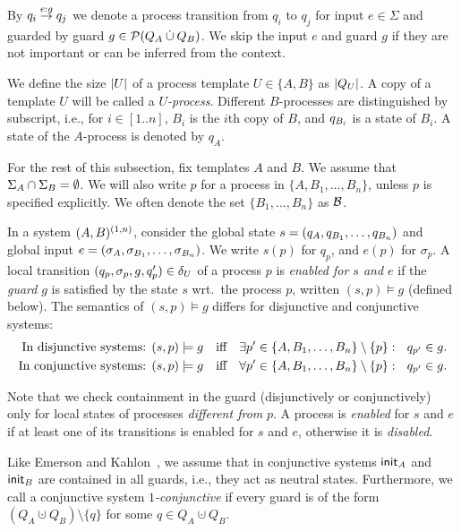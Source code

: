 By $\transition{q_i}{q_j}{e:g}$
we denote a process transition from $q_i$ to $q_j$
for input $e \in \Sigma$ and guarded by guard $g \in \mP(Q_A \cupdot Q_B)$.
We skip the input $e$ and guard $g$
if they are not important or can be inferred from the context.

We define the size $\card{U}$ of a process template $U \in \{A,B\}$ as $\card{\stateset_U}$. A copy of a template $U$ will be called a \emph{$U$-process}.
Different $B$-processes are distinguished by subscript, i.e., for $i \in [1..n]$, $B_i$ is the $i$th copy of $B$, and $\state_{B_i}$ is a state of $B_i$. A state of the $A$-process is denoted by $q_A$. 

For the rest of this subsection, fix templates $A$ and $B$. We assume that $\inputs_A \cap \inputs_B = \emptyset$. We will also write $p$ for a process in $\{ A, B_1, \ldots, B_n\}$, unless $p$ is specified explicitly.
We often denote the set $\{B_1,...,B_n\}$ as $\mB$.


In a system $\largesys$,
consider the global state $s = (\state_A,\state_{B_1},\ldots,\state_{B_n})$ and
global input $e=(\localin_A,\localin_{B_1},\ldots,\localin_{B_n})$.
We write $s(p)$ for $q_p$, and $e(p)$ for $\sigma_p$.
A local transition $(\state_p,\localin_p,g,\state_p') \in \delta_U$ of a process $p$ is \emph{enabled for $s$ and $e$}
if the \emph{guard} $g$ is satisfied by the state $s$ wrt.\ the process $p$, written $(s,p) \models g$ (defined below).
The semantics of $(s,p) \models g$ differs for disjunctive and conjunctive systems:
%
\begin{align*}
\text{In disjunctive systems: } & (s,p) \models g \text{~~~iff~~~} 
\exists p' \in \{A,B_1,\ldots,B_n\} \setminus \{p\}:\ \ \state_{p'} \in g. \\
\text{In conjunctive systems: } & (s,p) \models g \text{~~~iff~~~} 
\forall p' \in \{A,B_1,\ldots,B_n\} \setminus \{p\}:\ \ \state_{p'} \in g.
\end{align*}

Note that we check containment in the guard (disjunctively or conjunctively) 
only for local states of processes \emph{different from} $p$. A process is \emph{enabled} for $s$ and $e$ if at least one of its transitions is enabled for $s$ and $e$, otherwise it is \emph{disabled}.

Like Emerson and Kahlon~\cite{Emerson00}, 
we assume that in conjunctive systems $\init_A$ and $\init_B$ are contained in all guards,
i.e., they act as neutral states.
Furthermore, we call a conjunctive system \emph{$1$-conjunctive} if every guard is of the form $(Q_A \cupdot Q_B) \setminus \{q\}$ for some $q \in Q_A\cupdot Q_B$.

